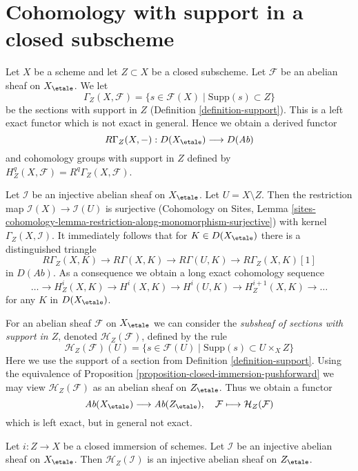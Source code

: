 \section{Cohomology with support in a closed subscheme}
\label{section-cohomology-support}

\noindent
Let $X$ be a scheme and let $Z \subset X$ be a closed subscheme.
Let $\mathcal{F}$ be an abelian sheaf on $X_\etale$. We let
$$
\Gamma_Z(X, \mathcal{F}) =
\{s \in \mathcal{F}(X) \mid \text{Supp}(s) \subset Z\}
$$
be the sections with support in $Z$ (Definition \ref{definition-support}).
This is a left exact functor which is not exact in general.
Hence we obtain a derived functor
$$
R\Gamma_Z(X, -) : D(X_\etale) \longrightarrow D(\textit{Ab})
$$
and cohomology groups with support in $Z$ defined by
$H^q_Z(X, \mathcal{F}) = R^q\Gamma_Z(X, \mathcal{F})$.

\medskip\noindent
Let $\mathcal{I}$ be an injective abelian sheaf on $X_\etale$.
Let $U = X \setminus Z$.
Then the restriction map $\mathcal{I}(X) \to \mathcal{I}(U)$ is surjective
(Cohomology on Sites, Lemma
\ref{sites-cohomology-lemma-restriction-along-monomorphism-surjective})
with kernel $\Gamma_Z(X, \mathcal{I})$. It immediately follows that
for $K \in D(X_\etale)$ there is a distinguished triangle
$$
R\Gamma_Z(X, K) \to R\Gamma(X, K) \to R\Gamma(U, K) \to R\Gamma_Z(X, K)[1]
$$
in $D(\textit{Ab})$. As a consequence we obtain a long exact cohomology
sequence
$$
\ldots \to H^i_Z(X, K) \to H^i(X, K) \to H^i(U, K) \to
H^{i + 1}_Z(X, K) \to \ldots
$$
for any $K$ in $D(X_\etale)$.

\medskip\noindent
For an abelian sheaf $\mathcal{F}$ on $X_\etale$ we can consider
the {\it subsheaf of sections with support in $Z$}, denoted
$\mathcal{H}_Z(\mathcal{F})$, defined by the rule
$$
\mathcal{H}_Z(\mathcal{F})(U) =
\{s \in \mathcal{F}(U) \mid \text{Supp}(s) \subset U \times_X Z\}
$$
Here we use the support of a section from Definition \ref{definition-support}.
Using the equivalence of
Proposition \ref{proposition-closed-immersion-pushforward}
we may view $\mathcal{H}_Z(\mathcal{F})$ as an abelian sheaf on
$Z_\etale$. Thus we obtain a functor
$$
\textit{Ab}(X_\etale) \longrightarrow \textit{Ab}(Z_\etale),\quad
\mathcal{F} \longmapsto \mathcal{H}_Z(\mathcal{F})
$$
which is left exact, but in general not exact.

\begin{lemma}
\label{lemma-sections-with-support-acyclic}
Let $i : Z \to X$ be a closed immersion of schemes.
Let $\mathcal{I}$ be an injective abelian sheaf on $X_\etale$.
Then $\mathcal{H}_Z(\mathcal{I})$ is an injective abelian sheaf
on $Z_\etale$.
\end{lemma}

